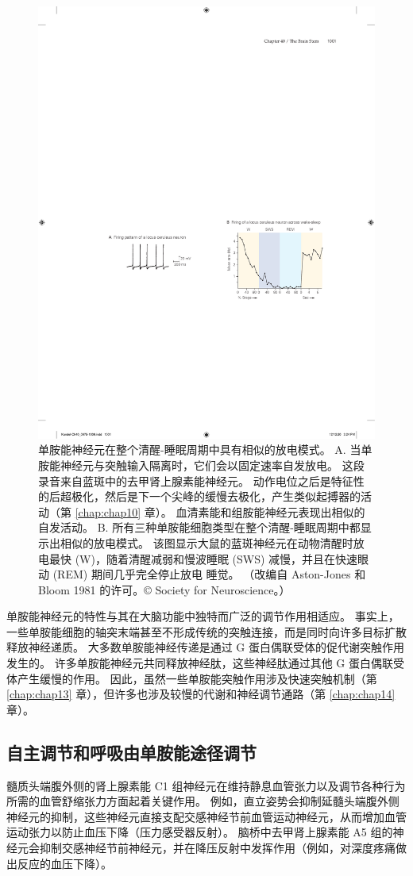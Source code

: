 \begin{figure}[htbp]
	\centering
	\includegraphics[width=0.45\linewidth]{chap40/fig_40_12}
	\caption{单胺能神经元在整个清醒-睡眠周期中具有相似的放电模式。 A. 当单胺能神经元与突触输入隔离时，它们会以固定速率自发放电。 这段录音来自蓝斑中的去甲肾上腺素能神经元。 动作电位之后是特征性的后超极化，然后是下一个尖峰的缓慢去极化，产生类似起搏器的活动（第 \ref{chap:chap10} 章）。 血清素能和组胺能神经元表现出相似的自发活动。 B. 所有三种单胺能细胞类型在整个清醒-睡眠周期中都显示出相似的放电模式。 该图显示大鼠的蓝斑神经元在动物清醒时放电最快 (W)，随着清醒减弱和慢波睡眠 (SWS) 减慢，并且在快速眼动 (REM) 期间几乎完全停止放电 睡觉。 （改编自 Aston-Jones 和 Bloom 1981 的许可。© Society for Neuroscience。）}
	\label{fig:40_12}
\end{figure}

单胺能神经元的特性与其在大脑功能中独特而广泛的调节作用相适应。 事实上，一些单胺能细胞的轴突末端甚至不形成传统的突触连接，而是同时向许多目标扩散释放神经递质。 大多数单胺能神经传递是通过 G 蛋白偶联受体的促代谢突触作用发生的。 许多单胺能神经元共同释放神经肽，这些神经肽通过其他 G 蛋白偶联受体产生缓慢的作用。 因此，虽然一些单胺能突触作用涉及快速突触机制（第 \ref{chap:chap13} 章），但许多也涉及较慢的代谢和神经调节通路（第 \ref{chap:chap14} 章）。

\subsection{自主调节和呼吸由单胺能途径调节}
髓质头端腹外侧的肾上腺素能 C1 组神经元在维持静息血管张力以及调节各种行为所需的血管舒缩张力方面起着关键作用。 例如，直立姿势会抑制延髓头端腹外侧神经元的抑制，这些神经元直接支配交感神经节前血管运动神经元，从而增加血管运动张力以防止血压下降（压力感受器反射）。 脑桥中去甲肾上腺素能 A5 组的神经元会抑制交感神经节前神经元，并在降压反射中发挥作用（例如，对深度疼痛做出反应的血压下降）。

